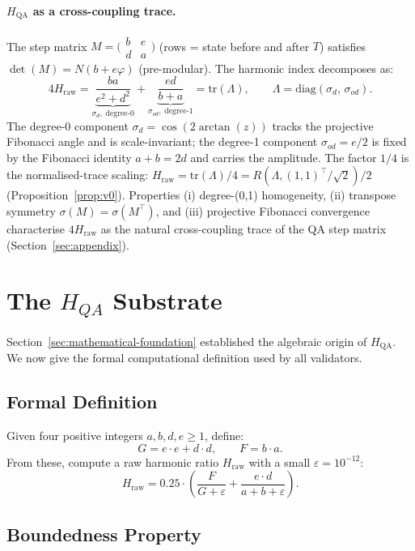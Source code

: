 \documentclass[11pt]{article}
\theoremstyle{definition}
\theoremstyle{remark}
\newcommand{\hqa}{H_{\mathrm{QA}}}
\newcommand{\hraw}{H_{\mathrm{raw}}}
\begin{document}
\paragraph{$\hqa$ as a cross-coupling trace.}
The step matrix $M=\bigl(\begin{smallmatrix}b&e\\d&a\end{smallmatrix}\bigr)$
(rows = state before and after $T$) satisfies $\det(M)=N(b+e\varphi)$
(pre-modular). The harmonic index decomposes as:
\[
  4\hraw = \underbrace{\frac{ba}{e^2+d^2}}_{\sigma_d,\;\text{degree-0}}
          + \underbrace{\frac{ed}{b+a}}_{\sigma_{od},\;\text{degree-1}}
          = \mathrm{tr}(\Lambda),
  \qquad \Lambda = \mathrm{diag}(\sigma_d,\,\sigma_{od}).
\]
The degree-0 component $\sigma_d=\cos(2\arctan(z))$ tracks the projective Fibonacci
angle and is scale-invariant; the degree-1 component $\sigma_{od}=e/2$ is fixed by
the Fibonacci identity $a+b=2d$ and carries the amplitude. The factor $1/4$ is the
normalised-trace scaling: $\hraw=\mathrm{tr}(\Lambda)/4=R(\Lambda,(1,1)^\top/\sqrt{2})/2$
(Proposition~\ref{prop:v0}).
Properties (i) degree-(0,1) homogeneity, (ii) transpose symmetry
$\sigma(M)=\sigma(M^\top)$, and (iii) projective Fibonacci convergence characterise
$4\hraw$ as the natural cross-coupling trace of the QA step matrix
(Section~\ref{sec:appendix}).

\section{The $H_{QA}$ Substrate}
\label{sec:substrate}

Section~\ref{sec:mathematical-foundation} established the algebraic origin of $\hqa$.
We now give the formal computational definition used by all validators.

\subsection{Formal Definition}

Given four positive integers $a, b, d, e \geq 1$, define:
\[
  G = e\cdot e + d\cdot d, \qquad F = b\cdot a.
\]
From these, compute a raw harmonic ratio $\hraw$ with a small $\varepsilon=10^{-12}$:
\[
  \hraw = 0.25 \cdot \left( \frac{F}{G + \varepsilon}
                           + \frac{e \cdot d}{a + b + \varepsilon} \right).
\]

\subsection{Boundedness Property}
\end{document}
